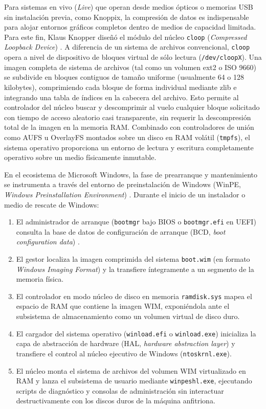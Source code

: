 \documentclass[12pt]{article}
\begin{document}
Para sistemas en vivo (\textit{Live}) que operan desde medios ópticos o memorias USB sin instalación previa, como Knoppix, la compresión de datos es indispensable para alojar entornos gráficos completos dentro de medios de capacidad limitada. Para este fin, Klaus Knopper diseñó el módulo del núcleo \texttt{cloop} (\textit{Compressed Loopback Device}) \parencite{knopper2024cloop}. A diferencia de un sistema de archivos convencional, \texttt{cloop} opera a nivel de dispositivo de bloques virtual de sólo lectura (\texttt{/dev/cloopX}). Una imagen completa de sistema de archivos (tal como un volumen ext2 o ISO 9660) se subdivide en bloques contiguos de tamaño uniforme (usualmente 64 o 128 kilobytes), comprimiendo cada bloque de forma individual mediante zlib e integrando una tabla de índices en la cabecera del archivo. Esto permite al controlador del núcleo buscar y descomprimir al vuelo cualquier bloque solicitado con tiempo de acceso aleatorio casi transparente, sin requerir la descompresión total de la imagen en la memoria RAM. Combinado con controladores de unión como AUFS u OverlayFS montados sobre un disco en RAM volátil (\texttt{tmpfs}), el sistema operativo proporciona un entorno de lectura y escritura completamente operativo sobre un medio físicamente inmutable.

En el ecosistema de Microsoft Windows, la fase de prearranque y mantenimiento se instrumenta a través del entorno de preinstalación de Windows (WinPE, \textit{Windows Preinstallation Environment}) \parencite{microsoft2024winpe}. Durante el inicio de un instalador o medio de rescate de Windows:
\begin{enumerate}[noitemsep, topsep=2pt]
    \item El administrador de arranque (\texttt{bootmgr} bajo BIOS o \texttt{bootmgr.efi} en UEFI) consulta la base de datos de configuración de arranque (BCD, \textit{boot configuration data}) \parencite{microsoft2024boot}.
    \item El gestor localiza la imagen comprimida del sistema \texttt{boot.wim} (en formato \textit{Windows Imaging Format}) y la transfiere íntegramente a un segmento de la memoria física.
    \item El controlador en modo núcleo de disco en memoria \texttt{ramdisk.sys} mapea el espacio de RAM que contiene la imagen WIM, exponiéndola ante el subsistema de almacenamiento como un volumen virtual de disco duro.
    \item El cargador del sistema operativo (\texttt{winload.efi} o \texttt{winload.exe}) inicializa la capa de abstracción de hardware (HAL, \textit{hardware abstraction layer}) y transfiere el control al núcleo ejecutivo de Windows (\texttt{ntoskrnl.exe}).
    \item El núcleo monta el sistema de archivos del volumen WIM virtualizado en RAM y lanza el subsistema de usuario mediante \texttt{winpeshl.exe}, ejecutando scripts de diagnóstico y consolas de administración sin interactuar destructivamente con los discos duros de la máquina anfitriona.
\end{enumerate}
\end{document}
